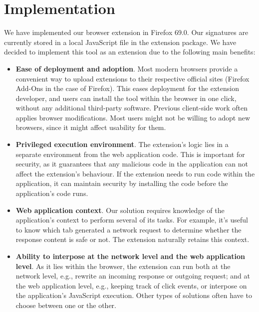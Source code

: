 \section{Implementation} \label{implementation}

We have implemented our browser extension in Firefox 69.0. Our signatures are currently stored in a local JavaScript file in the extension package. We have decided to implement this tool as an extension due to the following main benefits:
\begin{itemize}
	\item \textbf{Ease of deployment and adoption}. Most modern browsers provide a convenient way to upload extensions to their respective official sites (Firefox Add-Ons in the case of Firefox). This eases deployment for the extension developer, and users can install the tool within the browser in one click, without any additional third-party software. Previous client-side work often applies browser modifications. Most users might not be willing to adopt new browsers, since it might affect usability for them.
	\item \textbf{Privileged execution environment}. The extension's logic lies in a separate environment from the web application code. This is important for security, as it guarantees that any malicious code in the application can not affect the extension's behaviour. If the extension needs to run code within the application, it can maintain security by installing the code before the application's code runs.
	\item \textbf{Web application context}. Our solution requires knowledge of the application's context to perform several of its tasks. For example, it's useful to know which tab generated a network request to determine whether the response content is safe or not. The extension naturally retains this context.
	\item \textbf{Ability to interpose at the network level and the web application level}. As it lies within the browser, the extension can run both at the network level, e.g., rewrite an incoming response or outgoing request; and at the web application level, e.g., keeping track of click events, or interpose on the application's JavaScript execution. Other types of solutions often have to choose between one or the other.
\end{itemize}

